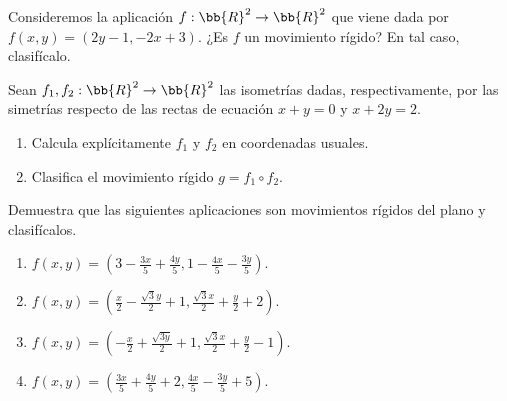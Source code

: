 \begin{ejercicio}
     Consideremos la aplicación $f : \bb{R}^2 \to \bb{R}^2$ que viene dada por $f(x, y) = (2y - 1, -2x + 3)$. ¿Es $f$ un movimiento rígido? En tal caso, clasifícalo.
\end{ejercicio}

\begin{ejercicio}
    Sean $f_1, f_2 : \bb{R}^2\to \bb{R}^2$ las isometrías dadas, respectivamente, por las simetrías respecto de las rectas de ecuación $x + y = 0$ y $x + 2y = 2$.
    \begin{enumerate}
        \item Calcula explícitamente $f_1$ y $f_2$ en coordenadas usuales.
        \item Clasifica el movimiento rígido $g = f_1 \circ f_2$.
    \end{enumerate}
\end{ejercicio}

\begin{ejercicio}
    Demuestra que las siguientes aplicaciones son movimientos rígidos del plano y clasifícalos.
    \begin{enumerate}
        \item $f\left(x, y\right) = \left(3 - \frac{3x}{5} + \frac{4y}{5}, 1 - \frac{4x}{5} - \frac{3y}{5}\right).$
        \item $f\left(x, y\right) = \left(\frac{x}{2} -\frac{\sqrt{3} y}{2} + 1,\frac{\sqrt{3} x}{2}+ \frac{y}{2} + 2\right).$
        \item $f\left(x, y\right) = \left(-\frac{x}{2} + \frac{\sqrt{3 y}}{2} + 1,\frac{\sqrt{3} x}{2} + \frac{y}{2} - 1\right).$
        \item $f\left(x, y\right) = \left(\frac{3x}{5} + \frac{4y}{5} + 2, \frac{4x}{5} - \frac{3y}{5} + 5\right).$
    \end{enumerate}
\end{ejercicio}

